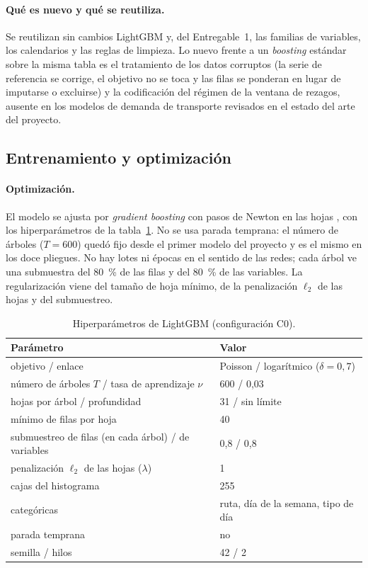 \paragraph{Qué es nuevo y qué se reutiliza.}
Se reutilizan sin cambios LightGBM \citep{ke2017lightgbm} y, del Entregable~1, las familias de variables, los
calendarios y las reglas de limpieza. Lo nuevo frente a un \emph{boosting} estándar sobre la misma tabla es
el tratamiento de los datos corruptos (la serie de referencia se corrige, el objetivo no se toca y las filas
se ponderan en lugar de imputarse o excluirse) y la codificación del régimen de la ventana de rezagos,
ausente en los modelos de demanda de transporte revisados en el estado del arte del proyecto.

\subsection{Entrenamiento y optimización}
\label{sec:entrenamiento}

\paragraph{Optimización.}
El modelo se ajusta por \emph{gradient boosting} con pasos de Newton en las hojas
\citep{friedman2001gbm,ke2017lightgbm}, con los hiperparámetros de la tabla~\ref{tab:hiper}. No se usa parada
temprana: el número de árboles ($T = 600$) quedó fijo desde el primer modelo del proyecto y es el mismo en los
doce pliegues. No hay lotes ni épocas en el sentido de las redes; cada árbol ve una submuestra del 80~\% de
las filas y del 80~\% de las variables. La regularización viene del tamaño de hoja mínimo, de la
penalización $\ell_2$ de las hojas y del submuestreo.

\begin{table}[t]
  \centering\small
  \caption{Hiperparámetros de LightGBM (configuración C0).}
  \label{tab:hiper}
  \begin{tabular}{@{}l l@{}}
    \toprule
    Parámetro & Valor \\
    \midrule
    objetivo / enlace & Poisson / logarítmico ($\delta = 0{,}7$) \\
    número de árboles $T$ / tasa de aprendizaje $\nu$ & 600 / 0,03 \\
    hojas por árbol / profundidad & 31 / sin límite \\
    mínimo de filas por hoja & 40 \\
    submuestreo de filas (en cada árbol) / de variables & 0,8 / 0,8 \\
    penalización $\ell_2$ de las hojas ($\lambda$) & 1 \\
    cajas del histograma & 255 \\
    categóricas & ruta, día de la semana, tipo de día \\
    parada temprana & no \\
    semilla / hilos & 42 / 2 \\
    \bottomrule
  \end{tabular}
\end{table}

